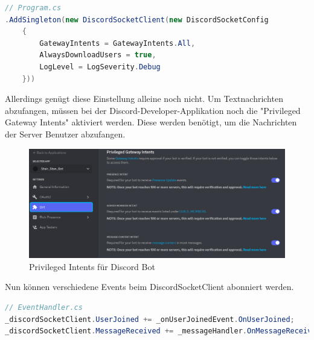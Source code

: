 \documentclass[a4paper, table]{article}
\begin{document}
\begin{lstlisting}[language=csharp]
// Program.cs
.AddSingleton(new DiscordSocketClient(new DiscordSocketConfig
    {
        GatewayIntents = GatewayIntents.All,
        AlwaysDownloadUsers = true,
        LogLevel = LogSeverity.Debug
    }))
\end{lstlisting}
Allerdings genügt diese Einstellung alleine noch nicht. 
Um Textnachrichten abzufangen, müssen bei der Discord-Developer-Applikation noch die "Privileged Gateway Intents" aktiviert werden. 
Diese werden benötigt, um die Nachrichten der Server Benutzer abzufangen.

\begin{figure}[h]
    \centering
    \includegraphics[width=1\textwidth]{img/discord_developer_privileged_intents.png}
    \caption{Privileged Intents für Discord Bot}
    \label{fig:delevoper-privileged-intents}
\end{figure}

Nun können verschiedene Events beim DiscordSocketClient abonniert werden.

\begin{lstlisting}[language=csharp]
// EventHandler.cs
_discordSocketClient.UserJoined += _onUserJoinedEvent.OnUserJoined;
_discordSocketClient.MessageReceived += _messageHandler.OnMessageReceived;
\end{lstlisting}
\end{document}
